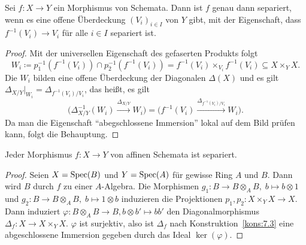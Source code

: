 \begin{lem}
\label{lem:10.2}
	Sei $f \colon X \to Y$ ein Morphismus von Schemata. Dann ist $f$ genau dann separiert, wenn es eine offene Überdeckung $(V_i)_{i\in I}$ von $Y$ gibt, mit der Eigenschaft, dass $f^{-1}(V_i) \to V_i$ für alle $i \in I$ separiert ist.
	\begin{proof}
		Mit der universellen Eigenschaft des gefaserten Produkts folgt
		\[
			W_i \coloneqq p_1^{-1}(f^{-1}(V_i)) \cap p_2^{-1}(f^{-1}(V_i)) = f^{-1}(V_i) \times_{V_i} f^{-1}(V_i) \subseteq X \times_Y X.
		\]
		Die $W_i$ bilden eine offene Überdeckung der Diagonalen $\Delta(X)$ und es gilt $\Delta_{X/Y}\vert_{W_i} = \Delta_{f^{-1}(V_i)/V_i}$, das heißt, es gilt
		\[
			\Bigg(\Delta^{-1}_{X/Y}(W_i) \xrightarrow{\Delta_{X/Y}} W_i\Bigg) = \Bigg(f^{-1}(V_i) \xrightarrow{\Delta_{f^{-1}(V_i)/V_i}} W_i\Bigg).
		\]
		Da man die Eigenschaft \enquote{abegschlossene Immersion} lokal auf dem Bild prüfen kann, folgt die Behauptung. 
	\end{proof}
\end{lem}

\pagebreak[2]
\begin{prop}
\label{prop:10.3}
	Jeder Morphismus $f\colon X \to Y$ von affinen Schemata ist separiert.
	\begin{proof}
		Seien $X=\operatorname{Spec}(B)$ und $Y=\operatorname{Spec}(A)$ für gewisse Ring $A$ und $B$. Dann wird $B$ durch $f$ zu einer $A$-Algebra. Die Morphismen $g_1\colon B \to B \otimes_A B,\; b \mapsto b \otimes 1$ und $g_2\colon B \to B \otimes_A B,\; b \mapsto 1 \otimes b$ induzieren die Projektionen $p_1,p_2 \colon X\times_Y X\to X$. Dann induziert $\varphi\colon B\otimes_A B \to B, b \otimes b' \mapsto bb'$ den Diagonalmorphismus $\Delta_f\colon X \to X \times_Y X$. $\varphi$ ist surjektiv, also ist $\Delta_f$ nach Konstruktion~\ref{kons:7.3} eine abgeschlossene Immersion gegeben durch das Ideal $\ker(\varphi)$.
	\end{proof}
\end{prop}


